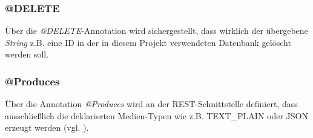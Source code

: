 \subsubsection*{@DELETE}
\label{sss:delete}
Über die \textit{@DELETE}-Annotation wird sichergestellt, dass wirklich der übergebene \textit{String} z.B. eine ID in der in diesem Projekt verwendeten Datenbank gelöscht werden soll. 

\subsubsection*{@Produces}
\label{sss:produces}
Über die Annotation  \textit{@Produces} wird an der \acs{REST}-Schnittstelle definiert, dass ausschließlich die deklarierten Medien-Typen wie z.B. TEXT\_PLAIN oder JSON erzeugt werden (vgl. ).